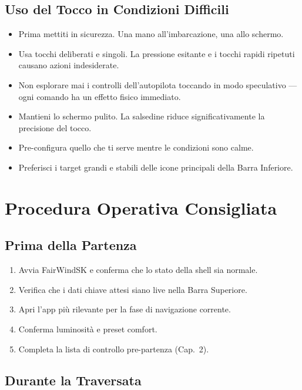 \section{Uso del Tocco in Condizioni Difficili}

\begin{itemize}
  \item Prima mettiti in sicurezza. Una mano all'imbarcazione, una allo schermo.
  \item Usa tocchi deliberati e singoli. La pressione esitante e i tocchi rapidi
        ripetuti causano azioni indesiderate.
  \item Non esplorare mai i controlli dell'autopilota toccando in modo speculativo ---
        ogni comando ha un effetto fisico immediato.
  \item Mantieni lo schermo pulito. La salsedine riduce significativamente la precisione
        del tocco.
  \item Pre-configura quello che ti serve mentre le condizioni sono calme.
  \item Preferisci i target grandi e stabili delle icone principali della Barra Inferiore.
\end{itemize}

\chapter{Procedura Operativa Consigliata}
\label{ch:procedura}

\section{Prima della Partenza}

\begin{enumerate}
  \item Avvia FairWindSK e conferma che lo stato della shell sia normale.
  \item Verifica che i dati chiave attesi siano live nella Barra Superiore.
  \item Apri l'app più rilevante per la fase di navigazione corrente.
  \item Conferma luminosità e preset comfort.
  \item Completa la lista di controllo pre-partenza (Cap.~2).
\end{enumerate}

\section{Durante la Traversata}

